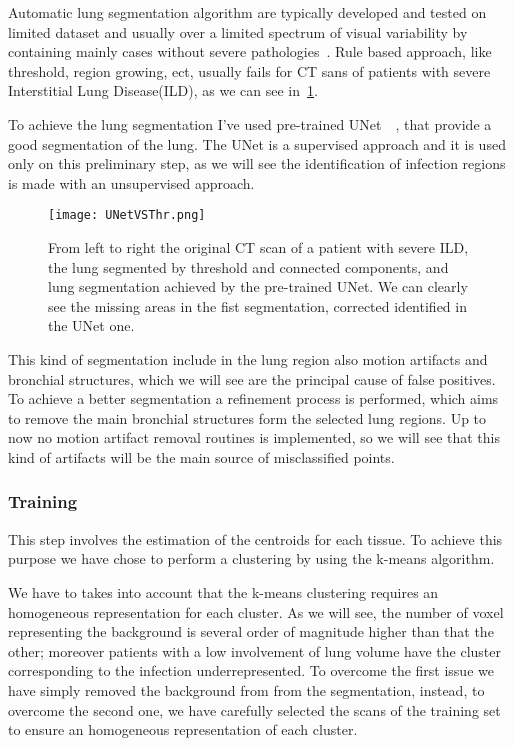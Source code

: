 \documentclass{standalone}
\begin{document}
	Automatic lung segmentation algorithm are typically developed and tested on limited dataset and usually over a limited spectrum of visual variability by containing mainly cases without severe pathologies~\cite{ART:Johannes}. Rule based approach, like threshold, region growing, ect, usually fails for CT sans of patients with severe Interstitial Lung Disease(ILD), as we can see in \figurename\,\ref{fig:UNetVSThr}. 
	
	To achieve the lung segmentation I've used  pre-trained UNet~\cite{ART:Johannes}~\cite{REP:lungmask}, that provide a good segmentation of the lung. 
	The UNet is a supervised approach and it is used only on this preliminary step, as we will see the identification of infection regions is made with an unsupervised approach.\\
	
	\begin{figure}[h!]
		\centering
		\texttt{[image: UNetVSThr.png]}
		\caption{From left to right the original CT scan of a patient with severe ILD, the lung segmented by threshold and connected components, and lung segmentation achieved by the pre-trained UNet. We can clearly see the missing areas in the fist segmentation, corrected identified in the UNet one.}\label{fig:UNetVSThr}
		
	\end{figure}
	
	This kind of segmentation include in the lung region also motion artifacts and bronchial structures, which we will see are the principal cause of false positives. To achieve a better segmentation a refinement process is performed, which aims to remove the main bronchial structures form the selected lung regions. Up to now no motion artifact removal routines is implemented, so we will see that this kind of artifacts will be the main source of misclassified points. 
	
	\subsubsection*{Training}
	
	This step involves the estimation of the centroids for each tissue. To achieve this purpose we have chose to perform a clustering by using the k-means algorithm. 
	
	We have to takes into account that the k-means clustering requires an homogeneous representation for each cluster. As we will see, the number of voxel representing the background is several order of magnitude higher than that the other; moreover patients with a low involvement of lung volume have the cluster corresponding to the infection underrepresented. To overcome the first issue we have simply removed the background from from the segmentation, instead, to overcome the second one, we have carefully selected the scans of the training set to ensure an homogeneous representation of each cluster.
	
\end{document}
